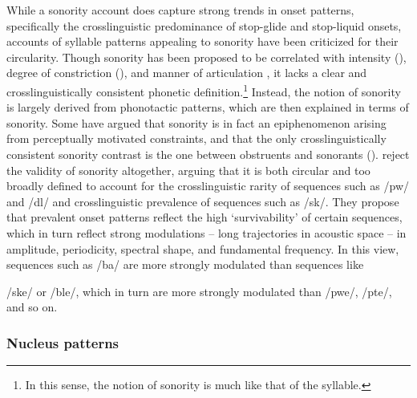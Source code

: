   While a sonority account does capture strong trends in onset patterns, specifically the crosslinguistic predominance of stop-glide and stop-liquid onsets, accounts of syllable patterns appealing to sonority have been criticized for their circularity. Though sonority has been proposed to be correlated with intensity (\citealt{Gordon2002,Parker2002}), degree of constriction (\citealt{Chin1996,Cser2003}), and manner of articulation \citep{Parker2011}, it lacks a clear and crosslinguistically consistent phonetic definition.\footnote{{In this sense, the notion of sonority is much like that of the syllable.}} Instead, the notion of sonority is largely derived from phonotactic patterns, which are then explained in terms of sonority. Some have argued that sonority is in fact an epiphenomenon arising from perceptually motivated constraints, and that the only crosslinguistically consistent sonority contrast is the one between obstruents and sonorants (\citealt{JanyEtAl2007,HenkeEtAl2012}). \citet{OhalaKawasaki-Fukumori1997} reject the validity of sonority altogether, arguing that it is both circular and too broadly defined to account for the crosslinguistic rarity of sequences such as /pw/ and /dl/ and crosslinguistic prevalence of sequences such as /sk/. They propose that prevalent onset patterns reflect the high ‘survivability’ of certain sequences, which in turn reflect strong modulations -- long trajectories in acoustic space --  in amplitude, periodicity, spectral shape, and fundamental frequency. In this view, sequences such as /ba/ are more strongly modulated than sequences like 

/ske/ or /ble/, which in turn are more strongly modulated than /pwe/, /pte/, and so on.

\subsubsection{{Nucleus} {patterns}}\label{sec:1.1.2.4}

